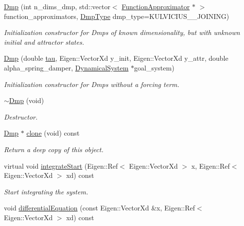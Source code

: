 \begin{DoxyCompactItemize}
\hyperlink{classDmpBbo_1_1Dmp_a30a4c3b7f5568b4d3f57e837241c4774}{Dmp} (int n\+\_\+dims\+\_\+dmp, std\+::vector$<$ \hyperlink{classDmpBbo_1_1FunctionApproximator}{Function\+Approximator} $\ast$ $>$ function\+\_\+approximators, \hyperlink{group__Dmps_gaccba8d09ec99ae66e469b3511bb232a4}{Dmp\+Type} dmp\+\_\+type=K\+U\+L\+V\+I\+C\+I\+U\+S\+\_\+\_\+\+J\+O\+I\+N\+I\+N\+G)
\begin{DoxyCompactList}\small\item\em Initialization constructor for Dmps of known dimensionality, but with unknown initial and attractor states. \end{DoxyCompactList}\item 
\hyperlink{classDmpBbo_1_1Dmp_a9e16b1345896b7f9cdf1158bb3708545}{Dmp} (double \hyperlink{group__DynamicalSystems_ga50eec7ad4c9664b5809ace45b22200d5}{tau}, Eigen\+::\+Vector\+Xd y\+\_\+init, Eigen\+::\+Vector\+Xd y\+\_\+attr, double alpha\+\_\+spring\+\_\+damper, \hyperlink{classDmpBbo_1_1DynamicalSystem}{Dynamical\+System} $\ast$goal\+\_\+system)
\begin{DoxyCompactList}\small\item\em Initialization constructor for Dmps without a forcing term. \end{DoxyCompactList}\item 
\hyperlink{classDmpBbo_1_1Dmp_adcfceacdeee98011a89fa27cc4799daf}{$\sim$\+Dmp} (void)
\begin{DoxyCompactList}\small\item\em Destructor. \end{DoxyCompactList}\item 
\hyperlink{classDmpBbo_1_1Dmp}{Dmp} $\ast$ \hyperlink{classDmpBbo_1_1Dmp_ace8e32350e4feb2c7ea6b5153c7dc606}{clone} (void) const 
\begin{DoxyCompactList}\small\item\em Return a deep copy of this object. \end{DoxyCompactList}\item 
virtual void \hyperlink{classDmpBbo_1_1Dmp_a44dd496535fde494d8465e7603c93db3}{integrate\+Start} (Eigen\+::\+Ref$<$ Eigen\+::\+Vector\+Xd $>$ x, Eigen\+::\+Ref$<$ Eigen\+::\+Vector\+Xd $>$ xd) const 
\begin{DoxyCompactList}\small\item\em Start integrating the system. \end{DoxyCompactList}\item 
void \hyperlink{classDmpBbo_1_1Dmp_ab564468764e7e4dc7c11e2a786e22c19}{differential\+Equation} (const Eigen\+::\+Vector\+Xd \&x, Eigen\+::\+Ref$<$ Eigen\+::\+Vector\+Xd $>$ xd) const 

\end{DoxyCompactItemize}
